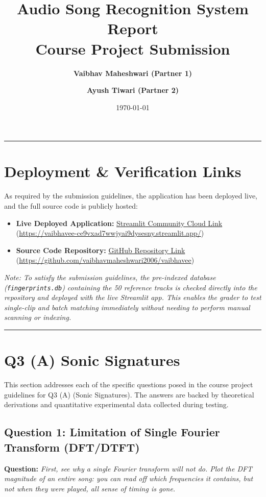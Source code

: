 \documentclass[11pt,a4paper]{article}
\title{\textbf{Audio Song Recognition System Report \\ \large Course Project Submission}}
\author{\textbf{Vaibhav Maheshwari (Partner 1)} \and \textbf{Ayush Tiwari (Partner 2)}}
\date{\today}
\begin{document}
\maketitle

\hrule
\vspace{0.4cm}

\section*{Deployment \& Verification Links}
As required by the submission guidelines, the application has been deployed live, and the full source code is publicly hosted:
\begin{itemize}
    \item \textbf{Live Deployed Application:} \href{https://vaibhavee-ce9vxad7wwjyai9dysesny.streamlit.app/}{Streamlit Community Cloud Link} \\ (\url{https://vaibhavee-ce9vxad7wwjyai9dysesny.streamlit.app/})
    \item \textbf{Source Code Repository:} \href{https://github.com/vaibhavmaheshwari2006/vaibhavee}{GitHub Repository Link} \\ (\url{https://github.com/vaibhavmaheshwari2006/vaibhavee})
\end{itemize}

\textit{Note: To satisfy the submission guidelines, the pre-indexed database (\texttt{fingerprints.db}) containing the 50 reference tracks is checked directly into the repository and deployed with the live Streamlit app. This enables the grader to test single-clip and batch matching immediately without needing to perform manual scanning or indexing.}

\vspace{0.4cm}
\hrule

\section{Q3 (A) Sonic Signatures}

This section addresses each of the specific questions posed in the course project guidelines for Q3 (A) (Sonic Signatures). The answers are backed by theoretical derivations and quantitative experimental data collected during testing.

\subsection{Question 1: Limitation of Single Fourier Transform (DFT/DTFT)}
\textbf{Question:} \textit{First, see why a single Fourier transform will not do. Plot the DFT magnitude of an entire song: you can read off which frequencies it contains, but not when they were played, all sense of timing is gone.}
\end{document}
